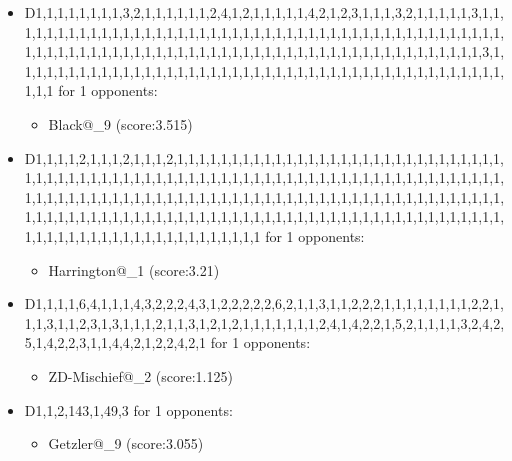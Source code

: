 \begin{appendices}
\begin{itemize}
        \item D1,1,1,1,1,1,1,1,3,2,1,1,1,1,1,1,2,4,1,2,1,1,1,1,1,4,2,1,2,3,1,1,1,3,2,1,1,1,1,1,3,1,1,1,1,1,1,1,1,1,1,1,1,1,1,1,1,1,1,1,1,1,1,1,1,1,1,1,1,1,1,1,1,1,1,1,1,1,1,1,1,1,1,1,1,1,1,1,1,1,1,1,1,1,1,1,1,1,1,1,1,1,1,1,1,1,1,1,1,1,1,1,1,1,1,1,1,1,1,1,1,1,1,1,1,1,1,1,1,3,1,1,1,1,1,1,1,1,1,1,1,1,1,1,1,1,1,1,1,1,1,1,1,1,1,1,1,1,1,1,1,1,1,1,1,1,1,1,1,1,1,1,1,1,1,1,1,1 for 1 opponents:
        \begin{multicols}{3}
            \begin{itemize}
                \item Black@\_9 (score:3.515)
            \end{itemize}
        \end{multicols}

        \item D1,1,1,1,2,1,1,1,2,1,1,1,2,1,1,1,1,1,1,1,1,1,1,1,1,1,1,1,1,1,1,1,1,1,1,1,1,1,1,1,1,1,1,1,1,1,1,1,1,1,1,1,1,1,1,1,1,1,1,1,1,1,1,1,1,1,1,1,1,1,1,1,1,1,1,1,1,1,1,1,1,1,1,1,1,1,1,1,1,1,1,1,1,1,1,1,1,1,1,1,1,1,1,1,1,1,1,1,1,1,1,1,1,1,1,1,1,1,1,1,1,1,1,1,1,1,1,1,1,1,1,1,1,1,1,1,1,1,1,1,1,1,1,1,1,1,1,1,1,1,1,1,1,1,1,1,1,1,1,1,1,1,1,1,1,1,1,1,1,1,1,1,1,1,1,1,1,1,1,1,1,1,1,1,1,1,1,1,1,1,1,1,1,1,1,1,1 for 1 opponents:
        \begin{multicols}{3}
            \begin{itemize}
                \item Harrington@\_1 (score:3.21)
            \end{itemize}
        \end{multicols}

        \item D1,1,1,1,6,4,1,1,1,4,3,2,2,2,4,3,1,2,2,2,2,2,6,2,1,1,3,1,1,2,2,2,1,1,1,1,1,1,1,1,2,2,1,1,1,3,1,1,2,3,1,3,1,1,1,2,1,1,3,1,2,1,2,1,1,1,1,1,1,1,2,4,1,4,2,2,1,5,2,1,1,1,1,3,2,4,2,5,1,4,2,2,3,1,1,4,4,2,1,2,2,4,2,1 for 1 opponents:
        \begin{multicols}{3}
            \begin{itemize}
                \item ZD-Mischief@\_2 (score:1.125)
            \end{itemize}
        \end{multicols}

        \item D1,1,2,143,1,49,3 for 1 opponents:
        \begin{multicols}{3}
            \begin{itemize}
                \item Getzler@\_9 (score:3.055)
            \end{itemize}
        \end{multicols}


\end{itemize}
\end{appendices}
